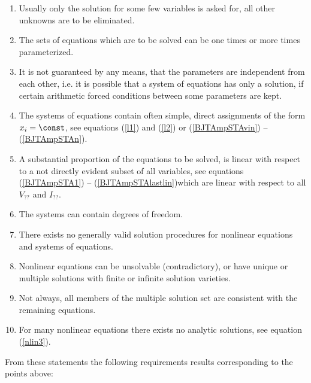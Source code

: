 \begin{enumerate}
\item Usually only the solution for some few variables is asked for, all other unknowns  are to be eliminated.

\item 
The sets of equations which are to be solved can be one times or more times parameterized.

\item 
It is not  guaranteed by any means, that the parameters are  independent from each other, i.e. it is possible that a system of equations has only a solution, if certain arithmetic forced conditions between some parameters are kept.

\item The systems of equations contain often simple, direct assignments of the form  $x_i = \const$, see equations (\ref{l1}) and 
(\ref{l2}) or (\ref{BJTAmpSTAvin}) -- (\ref{BJTAmpSTAn}).

\item A substantial proportion of the equations to be solved, is linear with respect to a not directly evident subset of all variables, see equations  (\ref{BJTAmpSTA1}) -- (\ref{BJTAmpSTAlastlin})which are linear with respect to all $V_{??}$ and $I_{??}$.

\item  The systems can contain degrees of freedom.

\item 
There exists no generally valid solution procedures for nonlinear equations and systems of equations.

\item 
Nonlinear equations can be unsolvable (contradictory), or have unique  or multiple solutions with finite or infinite solution varieties.

\item Not always, all members of the multiple solution set are consistent with the remaining equations.

\item  For many nonlinear equations there exists no analytic solutions, see equation (\ref{nlin3}).
\end{enumerate}


From these statements the following requirements results corresponding to the points above:


